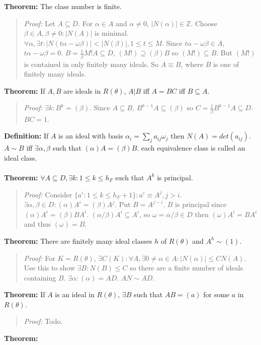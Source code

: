 {\bf Theorem:}
The class number is finite.
\begin{quote}
\emph{Proof:} 
Let $A \subseteq D$.  For $\alpha \in A$ and $\alpha \ne 0$, $|N(\alpha)| \in {\mathbb Z}$.
Choose $\beta \in A, \beta \ne 0: |N(A)|$ is minimal.  $\forall \alpha, \exists t:
|N(t \alpha - \omega \beta )| < |N(\beta)|, 1 \leq t \leq M$.  Since
$t \alpha - \omega \beta \in A$,
$t \alpha - \omega \beta = 0$.  $B = {\frac 1 {\beta}} M! A \subseteq D$,  $ (M!) \supseteq (\beta)B$ so
$(M!) \subseteq B$.  But $(M!)$ is contained in only finitely many ideals.  So $A \equiv B$, where
$B$ is one of finitely many ideals.
\end{quote}
{\bf Theorem:}
If $A, B$ are ideals in $R(\theta)$, $A|B$ iff $A=BC$ iff $B \subseteq A$.
\begin{quote}
\emph{Proof:} 
$\exists k: B^k = (\beta)$.  Since $A \subseteq B$, $B^{k-1} A \subseteq (\beta)$ so
$C= {\frac 1 {\beta}} B^{k-1}A \subseteq D$.  $BC=1$.
\end{quote}
{\bf Definition:}
If $A$ is an ideal with basis $\alpha_i= \sum_j a_{ij} \omega_j$ then
$N(A)= det (a_{ij})$.
$A \sim B$ iff $\exists \alpha, \beta$ such that $(\alpha)A=(\beta)B$.
each equivalence class is called an ideal class.
\\
\\
{\bf Theorem:} $\forall A \subseteq D, \exists k: 1 \leq k \leq h_F$ such that $A^k$ is principal.
\begin{quote}
\emph{Proof:} 
Consider $\{ a^i : 1 \leq k \leq h_F+1 \} : a^i \equiv A^j, j>i$.  $\exists \alpha , \beta \in D:
(\alpha) A^i= (\beta) A^j$.  Put $B= A^{j-i}$.  $B$ is principal since
$(\alpha) A^i = (\beta) B A^i$.  $( \alpha / \beta ) A^i \subseteq A^i$, so
$\omega= \alpha / \beta \in D$ then $(\omega) A^i = B A^i$ and thus $(\omega)= B$.
\end{quote}
{\bf Theorem:}
There are finitely many ideal classes $h$ of $R(\theta)$ and $A^h \sim
(1)$.
\begin{quote}
\emph{Proof:} 
For $K=R(\theta)$, $\exists C(K): \forall A, \exists 0 \ne \alpha \in A:
|N(\alpha)| \leq C N(A)$.  Use this to show $\exists B:N(B) \leq C$ so there are a finite
number of ideals containing $B$. $\exists \alpha: (\alpha)=AD$.  $AN \sim AD$.
\end{quote}
{\bf Theorem:}
If $A$ is an ideal in $R(\theta)$, $\exists B$ such that $AB= (a)$ for some
$a$ in $R(\theta)$.
\begin{quote}
\emph{Proof:} Todo.
\end{quote}
{\bf Theorem:}
